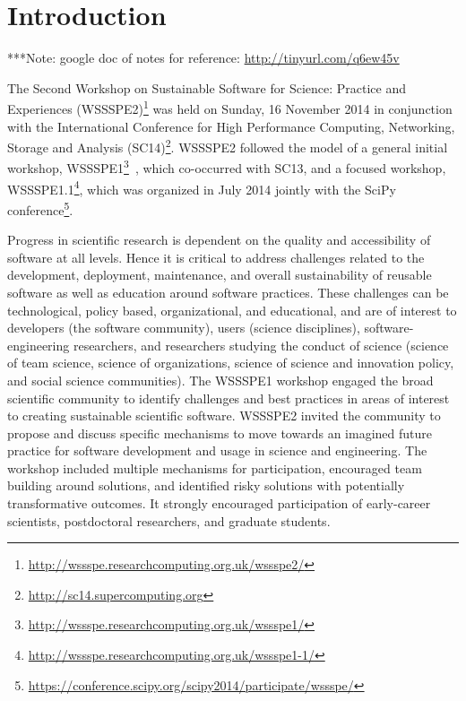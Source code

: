 \documentclass[11pt, oneside]{amsart}
\newcommand{\note}[1]{ {\textcolor{blueish}    { ***Note:      #1 }}}
\newcommand{\katznote}[1]{ {\textcolor{magenta}    { ***Dan:      #1 }}}
\newcommand{\gabnote}[1]{ {\textcolor{cyan}    { ***Gabrielle:     #1 }}}
\newcommand{\nchnote}[1]{  {\textcolor{orange}      { ***Neil: #1 }}}
\newcommand{\manishnote}[1]{  {\textcolor{violet}     { ***Manish: #1 }}}
\newcommand{\davidnote}[1]{  {\textcolor{darkgreen}      { ***David: #1 }}}
\begin{document}
\maketitle


\section{Introduction} \label{sec:intro}

%
%
%
%

\note{google doc of notes for reference: \url{http://tinyurl.com/q6ew45v}}

The Second Workshop on Sustainable Software for Science: Practice and
Experiences
(WSSSPE2)\footnote{\url{http://wssspe.researchcomputing.org.uk/wssspe2/}} was
held on Sunday, 16 November 2014 in conjunction with the International
Conference for High Performance Computing, Networking, Storage and Analysis
(SC14)\footnote{\url{http://sc14.supercomputing.org}}. WSSSPE2 followed the
model of a general initial workshop,
WSSSPE1\footnote{\url{http://wssspe.researchcomputing.org.uk/wssspe1/}}~\cite{WSSSPE1-pre-report,WSSSPE1},
which co-occurred with SC13, and a focused workshop,
WSSSPE1.1\footnote{\url{http://wssspe.researchcomputing.org.uk/wssspe1-1/}},
which was organized in July 2014 jointly with the SciPy 
conference\footnote{\url{https://conference.scipy.org/scipy2014/participate/wssspe/}}.

Progress in scientific research is dependent on the quality and accessibility of
software at all levels. Hence it is critical to address challenges related to
the development, deployment, maintenance, and overall sustainability of reusable
software as well as education around software practices. These challenges can be
technological, policy based, organizational, and educational, and are of
interest to developers (the software community), users (science disciplines),
software-engineering researchers, and researchers studying the conduct of
science (science of team science, science of organizations, science of science
and innovation policy, and social science communities). The WSSSPE1 workshop
engaged the broad scientific community to identify challenges and best practices
in areas of interest to creating sustainable scientific software. WSSSPE2
invited the community to propose and discuss specific mechanisms to move towards
an imagined future practice for software development and usage in science and
engineering. The workshop included multiple mechanisms for participation,
encouraged team building around solutions, and identified risky solutions with
potentially transformative outcomes. It strongly encouraged participation of
early-career scientists, postdoctoral researchers, and graduate students.
\end{document}
